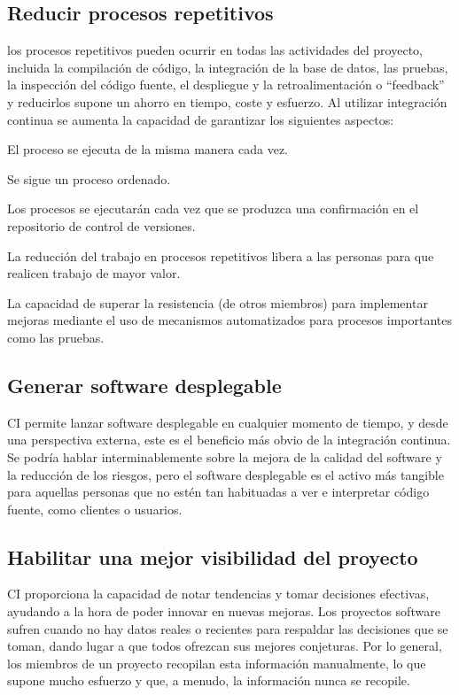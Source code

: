 \subsection{Reducir procesos repetitivos}
los procesos repetitivos pueden ocurrir en todas las actividades del proyecto, incluida la compilación de código, la integración de la base de datos, las pruebas, la inspección del código fuente, el despliegue y la retroalimentación o “feedback” y reducirlos supone un ahorro en tiempo, coste y esfuerzo. Al utilizar integración continua se aumenta la capacidad de garantizar los siguientes aspectos:
\begin{compactitem}
    \item El proceso se ejecuta de la misma manera cada vez.
    \item Se sigue un proceso ordenado.
    \item Los procesos se ejecutarán cada vez que se produzca una confirmación en el repositorio de control de versiones. 
    \item La reducción del trabajo en procesos repetitivos libera a las personas para que realicen trabajo de mayor valor.
    \item La capacidad de superar la resistencia (de otros miembros) para implementar mejoras mediante el uso de mecanismos automatizados para procesos importantes como las pruebas.
\end{compactitem}
\subsection{Generar software desplegable}
CI permite lanzar software desplegable en cualquier momento de tiempo, y desde una perspectiva externa, este es el beneficio más obvio de la integración continua. Se podría hablar interminablemente sobre la mejora de la calidad del software y la reducción de los riesgos, pero el software desplegable es el activo más tangible para aquellas personas que no estén tan habituadas a ver e interpretar código fuente, como clientes o usuarios.
\subsection{Habilitar una mejor visibilidad del proyecto}
CI proporciona la capacidad de notar tendencias y tomar decisiones efectivas, ayudando a la hora de poder innovar en nuevas mejoras. Los proyectos software sufren cuando no hay datos reales o recientes para respaldar las decisiones que se toman, dando lugar a que todos ofrezcan sus mejores conjeturas. Por lo general, los miembros de un proyecto recopilan esta información manualmente, lo que supone mucho esfuerzo y que, a menudo, la información nunca se recopile. 

